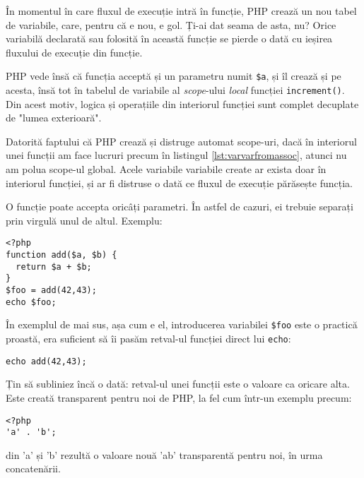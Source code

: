 În momentul în care fluxul de execuție intră în funcție,
PHP crează un nou tabel de variabile, care,
pentru că e nou, e gol. Ți-ai dat seama de asta, nu?
Orice variabilă declarată sau folosită în această funcție se pierde o dată cu ieșirea
fluxului de execuție din funcție.

PHP vede însă că funcția acceptă și un parametru numit \texttt{\$a}, și îl crează și pe acesta, însă
tot în tabelul de variabile al \textit{scope}-ului \textsl{local} funcției \texttt{increment()}.
Din acest motiv, logica și operațiile din interiorul funcției sunt complet decuplate
de "lumea exterioară".

Datorită faptului că PHP crează și distruge automat scope-uri, dacă în interiorul
unei funcții am face lucruri precum în listingul \ref{lst:varvarfromassoc},
atunci nu am polua scope-ul global. Acele variabile variabile create ar exista
doar în interiorul funcției, și ar fi distruse o dată ce fluxul de execuție
părăsește funcția.


O funcție poate accepta oricâți parametri. În astfel de cazuri, ei trebuie separați
prin virgulă unul de altul. Exemplu:
\begin{lstlisting}
<?php
function add($a, $b) {
  return $a + $b;
}
$foo = add(42,43);
echo $foo;
\end{lstlisting}



În exemplul de mai sus, așa cum e el, introducerea variabilei \texttt{\$foo}
este o practică proastă, era suficient să îi pasăm retval-ul
funcției direct lui \texttt{echo}:
\begin{lstlisting}
echo add(42,43);
\end{lstlisting}

Țin să subliniez încă o dată: retval-ul unei funcții este o valoare
ca oricare alta. Este creată transparent pentru noi de PHP, la fel
cum într-un exemplu precum:
\begin{lstlisting}
<?php
'a' . 'b';
\end{lstlisting}
din 'a' și 'b' rezultă o valoare nouă 'ab' transparentă pentru noi, în urma concatenării.

